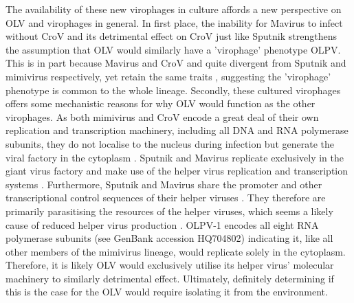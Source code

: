 The availability of these new virophages in culture affords a new perspective on \ac{OLV} and virophages in general.
In first place, the inability for Mavirus to infect without \ac{CroV} and its detrimental effect on \ac{CroV} just like Sputnik strengthens the assumption that OLV would similarly have a 'virophage' phenotype \ac{OLPV}.
This is in part because Mavirus and \ac{CroV} and quite divergent from Sputnik and mimivirus respectively, yet retain the same traits \cite{Fischer2010, Fischer2011}, suggesting the 'virophage' phenotype is common to the whole lineage.
Secondly, these cultured virophages offers some mechanistic reasons for why \ac{OLV} would function as the other virophages.
As both mimivirus and \ac{CroV} encode a great deal of their own replication and transcription machinery, including all \textsc{DNA} and \textsc{RNA} polymerase subunits, they do not localise to the nucleus during infection but generate the viral factory in the cytoplasm \cite{LaScola2008, Fischer2011}.
Sputnik and Mavirus replicate exclusively in the giant virus factory and make use of the helper virus replication and transcription systems \cite{LaScola2008, Fischer2011}.
Furthermore, Sputnik and Mavirus share the promoter and other transcriptional control sequences of their helper viruses \cite{Claverie2009, Fischer2011}.
They therefore are primarily parasitising the resources of the helper viruses, which seems a likely cause of reduced helper virus production \cite{Claverie2009, Fischer2011}.
\ac{OLPV}-1 encodes all eight \textsc{RNA} polymerase subunits (see GenBank accession HQ704802) indicating it, like all other members of the mimivirus lineage, would replicate solely in the cytoplasm.
Therefore, it is likely \ac{OLV} would exclusively utilise its helper virus' molecular machinery to similarly detrimental effect.
Ultimately, definitely determining if this is the case for the \ac{OLV} would require isolating it from the environment.

